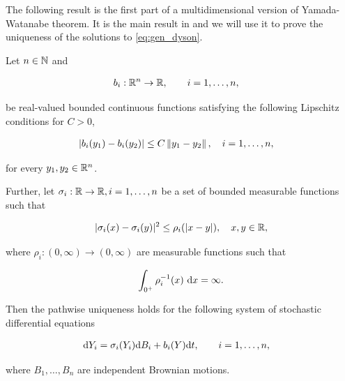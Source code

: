 The following result is the first part of a multidimensional version of Yamada-Watanabe theorem. It is the main result in \cite{article:multiyamada} and we will use it to prove the uniqueness of the solutions to \eqref{eq:gen_dyson}.

\begin{theorem}%
    \label{thm:mult_yamada_watanabe}
    Let $n\in \mathbb N$ and %

    \begin{align*}
        b_i&: \R^n \to \R, \qquad i = 1, \dots, n,%
    \end{align*}

    \noindent be real-valued bounded continuous functions satisfying the following Lipschitz conditions for $C>0$,

    \begin{align*}
        \abs{b_i(y_1) - b_i(y_2)} &\le C \norm{y_1 - y_2}, \quad i = 1, \dots, n,%
    \end{align*}

    \noindent for every $y_1, y_2 \in \mathbb R^n$. %

    Further, let $\sigma_i:\mathbb R \to \mathbb R, i =1, \dots, n$ be a set of bounded measurable functions such that

    \[ \lvert \sigma_i(x) - \sigma_i(y) \rvert^2 \le \rho_i(\lvert x-y \rvert), \quad x,y \in \mathbb R, \]

    \noindent where $\rho_i:(0,\infty)\to(0,\infty)$ are measurable functions such that 

    \[ \int_{0^+} \rho_i^{-1}(x)~\mathrm d x = \infty.\]

    Then the pathwise uniqueness holds for the following system of stochastic differential equations

    \begin{align}
        \d Y_i &= \sigma_i(Y_i)\d B_i + b_i(Y)\d t, \qquad i = 1, \dots, n,%
    \end{align}

    \noindent where $B_1, \dots, B_{n}$ are independent Brownian motions.
\end{theorem}

